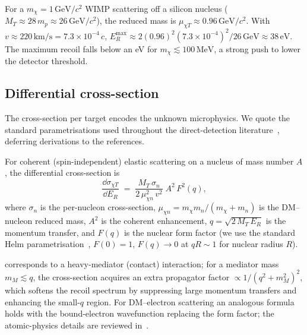 \begin{example}
\label{ex:wimp-on-Si}
For a $m_\chi=1\,\text{GeV}/c^2$ WIMP scattering off a silicon
nucleus ($M_T\approx 28\,m_p\approx 26\,\text{GeV}/c^2$), the
reduced mass is $\mu_{\chi T}\approx 0.96\,\text{GeV}/c^2$. With
$v\approx 220\,\text{km}/\text{s}=7.3\times 10^{-4}\,c$,
$E_R^\text{max}\approx 2(0.96)^2(7.3\times 10^{-4})^2/26\,\text{GeV}
\approx 38\,\text{eV}$. The maximum recoil falls below an eV for
$m_\chi\lesssim 100\,\text{MeV}$, a strong push to lower the
detector threshold.
\end{example}

\subsection{Differential cross-section}
\label{sec:recoil-xsec}

The cross-section per target encodes the unknown microphysics. We
quote the standard parametrisations used throughout the
direct-detection literature~\cite{lewin1996}, deferring derivations
to the references.

\begin{statement}
\label{stmt:si-xsec}
For coherent (spin-independent) elastic scattering on a nucleus of
mass number $A$, the differential cross-section is
\begin{equation}
\label{eq:dsigma-dE-SI}
\frac{\dd\sigma_{\chi T}}{\dd E_R}
\;=\; \frac{M_T\,\sigma_n}{2\,\mu_{\chi n}^2\,v^2}\;A^2\,F^2(q),
\end{equation}
where $\sigma_n$ is the per-nucleon cross-section,
$\mu_{\chi n}=m_\chi m_n/(m_\chi+m_n)$ is the DM--nucleon reduced
mass, $A^2$ is the coherent enhancement, $q=\sqrt{2\,M_T\,E_R}$ is
the momentum transfer, and $F(q)$ is the nuclear form factor (we
use the standard Helm parametrisation~\cite{helm1956}, $F(0)=1$,
$F(q)\to 0$ at $qR\sim 1$ for nuclear radius $R$).
\end{statement}

\begin{remark}
 corresponds to a heavy-mediator (contact)
interaction; for a mediator mass $m_M\lesssim q$, the cross-section
acquires an extra propagator factor $\propto 1/(q^2+m_M^2)^2$, which
softens the recoil spectrum by suppressing large momentum transfers
and enhancing the small-$q$ region. For DM--electron scattering an
analogous formula holds with the bound-electron wavefunction
replacing the form factor; the atomic-physics details are reviewed
in~\cite{essig2012}.
\end{remark}

